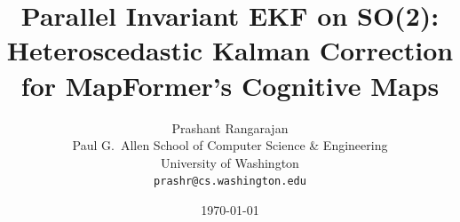 \documentclass[11pt]{article}
\title{
  Parallel Invariant EKF on SO(2): \\
  Heteroscedastic Kalman Correction for MapFormer's Cognitive Maps
}
\author{
  Prashant Rangarajan \\
  Paul G.\ Allen School of Computer Science \& Engineering \\
  University of Washington \\
  \texttt{prashr@cs.washington.edu}
}
\date{\today}
\begin{document}
\maketitle

\begin{abstract}
  
\end{abstract}










\end{document}
